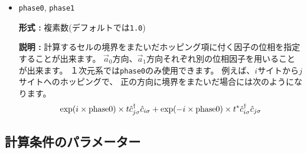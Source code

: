 \begin{itemize}
\item \verb|phase0|, \verb|phase1|

  {\bf 形式 :} 複素数(デフォルトでは\verb|1.0|)
  
  {\bf 説明 :} 計算するセルの境界をまたいだホッピング項に付く因子の位相を指定することが出来ます。
  $\vec{a}_0$方向、$\vec{a}_1$方向それぞれ別の位相因子を用いることが出来ます。
  １次元系では\verb|phase0|のみ使用できます。
  例えば、$i$サイトから$j$サイトへのホッピングで、
  正の方向に境界をまたいだ場合には次のようになります。
  \begin{align}
    \exp(i \times {\rm phase0}) \times t {\hat c}_{j \sigma}^\dagger {\hat c}_{i \sigma}
    + \exp(-i \times {\rm phase0}) \times t^* {\hat c}_{i \sigma}^\dagger {\hat c}_{j \sigma}
  \end{align}

\end{itemize}

\subsection{計算条件のパラメーター}

